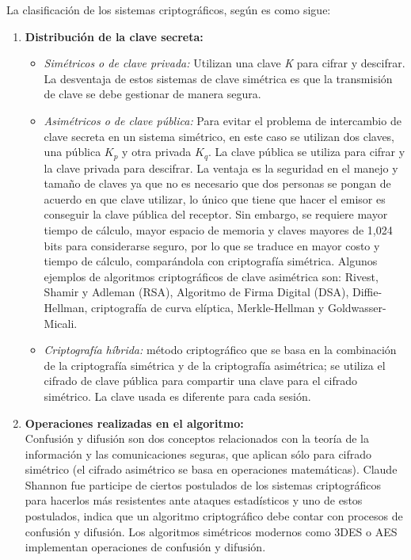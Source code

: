 La clasificación de los sistemas criptográficos, según \cite{KyS_1997} es como sigue:
\begin{enumerate}
\item \textbf{Distribución de la clave secreta:} 
\begin{itemize}
\item \textit{Simétricos o de clave privada:} Utilizan una clave \textit{K} para cifrar y descifrar. La 		desventaja de estos sistemas de clave simétrica es que la transmisión de clave se debe gestionar de manera 		segura. 
\item \textit{Asimétricos o de clave pública:} Para evitar el problema de intercambio de clave secreta en 		un sistema simétrico, en este caso se utilizan dos claves, una pública $K_{p}$ y otra privada $K_{q}$. La 		clave pública se utiliza para cifrar y la clave privada para descifrar. La ventaja es la seguridad en el manejo y tamaño de claves ya que no es necesario que dos personas se pongan de acuerdo en que clave utilizar, lo único que tiene que hacer el emisor es conseguir la clave pública del receptor. Sin embargo, se requiere 	mayor tiempo de cálculo, mayor espacio de memoria y claves mayores de 1,024 bits para considerarse seguro, 		por lo que se traduce en mayor costo y tiempo de cálculo, comparándola con criptografía simétrica. Algunos ejemplos de	algoritmos criptográficos de clave asimétrica son: Rivest, Shamir y Adleman (RSA), Algoritmo de Firma Digital (DSA), Diffie-Hellman, criptografía de curva elíptica, Merkle-Hellman y Goldwasser-Micali. 
\item \textit{Criptografía híbrida:} método criptográfico que se basa en la combinación de la criptografía simétrica y de la criptografía asimétrica; se utiliza el cifrado de clave pública para compartir una clave para el cifrado simétrico. La clave usada es diferente para cada sesión. 
\end{itemize}   
\item \textbf{Operaciones realizadas en el algoritmo:} \vspace{0.3cm} \\
Confusión y difusión son dos conceptos relacionados con la teoría de la información y las comunicaciones seguras, que aplican sólo para cifrado simétrico (el cifrado asimétrico se basa en operaciones matemáticas). Claude Shannon fue participe de ciertos postulados de los sistemas criptográficos para hacerlos más resistentes ante ataques estadísticos y uno de estos postulados, indica que un algoritmo criptográfico debe contar con procesos de confusión y difusión. Los algoritmos simétricos modernos como 3DES o AES implementan operaciones de confusión y difusión.

\end{enumerate}

